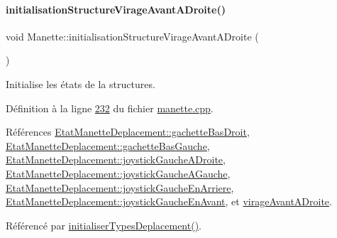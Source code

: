 \paragraph{\texorpdfstring{initialisation\+Structure\+Virage\+Avant\+A\+Droite()}{initialisationStructureVirageAvantADroite()}}
{\footnotesize\ttfamily void Manette\+::initialisation\+Structure\+Virage\+Avant\+A\+Droite (\begin{DoxyParamCaption}{ }\end{DoxyParamCaption})\hspace{0.3cm}{\ttfamily [private]}}



Initialise les états de la structures. 



Définition à la ligne \hyperlink{manette_8cpp_source_l00232}{232} du fichier \hyperlink{manette_8cpp_source}{manette.\+cpp}.



Références \hyperlink{manette_8h_source_l00185}{Etat\+Manette\+Deplacement\+::gachette\+Bas\+Droit}, \hyperlink{manette_8h_source_l00184}{Etat\+Manette\+Deplacement\+::gachette\+Bas\+Gauche}, \hyperlink{manette_8h_source_l00183}{Etat\+Manette\+Deplacement\+::joystick\+Gauche\+A\+Droite}, \hyperlink{manette_8h_source_l00182}{Etat\+Manette\+Deplacement\+::joystick\+Gauche\+A\+Gauche}, \hyperlink{manette_8h_source_l00181}{Etat\+Manette\+Deplacement\+::joystick\+Gauche\+En\+Arriere}, \hyperlink{manette_8h_source_l00180}{Etat\+Manette\+Deplacement\+::joystick\+Gauche\+En\+Avant}, et \hyperlink{manette_8h_source_l00236}{virage\+Avant\+A\+Droite}.



Référencé par \hyperlink{manette_8cpp_source_l00085}{initialiser\+Types\+Deplacement()}.


